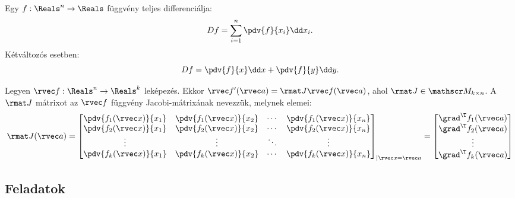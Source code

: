 \documentclass[a4paper, 12pt, fleqn]{scrartcl}
\begin{document}
\begin{blueBox}

  Egy $f: \Reals^n \to \Reals$ függvény teljes differenciálja:
  $$
    Df = \sum_{i = 1}^n \pdv{f}{x_i} \dd x_i
    \text.
  $$
  Kétváltozós esetben:
  $$
    Df
    = \pdv{f}{x} \dd x
    + \pdv{f}{y} \dd y
    \text.
  $$
\end{blueBox}

\begin{definition}
  Legyen $\rvec f: \Reals^n \to \Reals^k$ leképezés.
  Ekkor $\rvec f'(\rvec a) = \rmat J \rvec f(\rvec a)$,
  ahol $\rmat J \in \mathscr M_{k \times n}$. A $\rmat J$ mátrixot az
  $\rvec f$ függvény Jacobi-mátrixának nevezzük, melynek elemei:
  \def\arraystretch{1.5}
  $$
    \rmat J(\rvec a) = \begin{bmatrix}
      \displaystyle\pdv{f_1(\rvec x)}{x_1} & \displaystyle\pdv{f_1(\rvec x)}{x_2} & \cdots & \displaystyle\pdv{f_1(\rvec x)}{x_n} \\
      \displaystyle\pdv{f_2(\rvec x)}{x_1} & \displaystyle\pdv{f_2(\rvec x)}{x_2} & \cdots & \displaystyle\pdv{f_2(\rvec x)}{x_n} \\
      \vdots                               & \vdots                               & \ddots & \vdots                               \\
      \displaystyle\pdv{f_k(\rvec x)}{x_1} & \displaystyle\pdv{f_k(\rvec x)}{x_2} & \cdots & \displaystyle\pdv{f_k(\rvec x)}{x_n}
    \end{bmatrix}_{|\rvec x = \rvec a} = \begin{bmatrix}
      \grad^\T f_1(\rvec a) \vphantom{\displaystyle\pdv{f_1}{x_1}} \\
      \grad^\T f_2(\rvec a) \vphantom{\displaystyle\pdv{f_1}{x_1}} \\
      \vdots                                                       \\
      \grad^\T f_k(\rvec a) \vphantom{\displaystyle\pdv{f_1}{x_1}}
    \end{bmatrix}
  $$
\end{definition}

\clearpage
\subsection{Feladatok}
\end{document}
